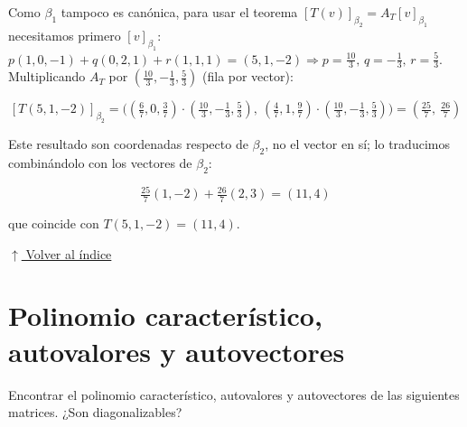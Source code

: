 \documentclass[12pt]{article}
\newcommand{\volverindice}{%
    \vspace{1em}%
    \begin{flushright}%
        \hyperlink{indice}{\small $\uparrow$ Volver al índice}%
    \end{flushright}%
}
\begin{document}
\begin{enumerate}[label=\alph*.-]
    Como $\beta_1$ tampoco es canónica, para usar el teorema
    $[T(v)]_{\beta_2}=A_T[v]_{\beta_1}$ necesitamos primero
    $[v]_{\beta_1}$: $p(1,0,-1)+q(0,2,1)+r(1,1,1)=(5,1,-2)\Rightarrow
    p=\tfrac{10}{3},\,q=-\tfrac13,\,r=\tfrac53$. Multiplicando $A_T$
    por $(\tfrac{10}{3},-\tfrac13,\tfrac53)$ (fila por vector):

    \[
    [T(5,1,-2)]_{\beta_2}=\Big((\tfrac67,0,\tfrac37)\cdot(\tfrac{10}{3},-\tfrac13,\tfrac53),\
    (\tfrac47,1,\tfrac97)\cdot(\tfrac{10}{3},-\tfrac13,\tfrac53)\Big)
    =\left(\tfrac{25}{7},\ \tfrac{26}{7}\right)
    \]

    Este resultado son coordenadas respecto de $\beta_2$, no el
    vector en sí; lo traducimos combinándolo con los vectores de
    $\beta_2$:

    \[
    \boxed{\tfrac{25}{7}(1,-2)+\tfrac{26}{7}(2,3)=(11,4)}
    \]

    que coincide con $T(5,1,-2)=(11,4)$. \checkmark

\end{enumerate}

\volverindice
\newpage


\setcounter{section}{6}

\section{Polinomio característico, autovalores y autovectores}

Encontrar el polinomio característico, autovalores y autovectores de
las siguientes matrices. ¿Son diagonalizables?
\end{document}
